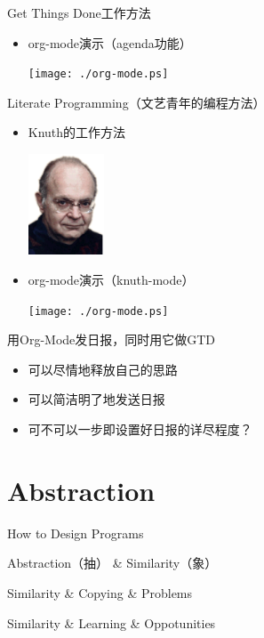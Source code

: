 \documentclass[presentation,dvipdfmx,CJKbookmarks]{beamer}
\begin{document}
\begin{CJK*}{UTF8}{simsun}
\begin{frame}[label={sec:org8fbf8ad}]{Get Things Done\thinspace 工作方法}
\begin{itemize}[<+->]
\item org-mode\thinspace 演示（agenda\thinspace 功能）

\begin{center}
\texttt{[image: ./org-mode.ps]}
\end{center}
\end{itemize}
\end{frame}

\begin{frame}[label={sec:orgecec971}]{Literate Programming（文艺青年的编程方法）}
\begin{itemize}[<+->]
\item Knuth\thinspace 的工作方法

\begin{center}
\includegraphics[height=3cm]{./knuth.ps}
\end{center}

\item org-mode\thinspace 演示（knuth-mode）

\begin{center}
\texttt{[image: ./org-mode.ps]}
\end{center}
\end{itemize}
\end{frame}

\begin{frame}[label={sec:orgbe044d0}]{用\thinspace Org-Mode\thinspace 发日报，同时用它做\thinspace GTD}
\begin{itemize}
\item 可以尽情地释放自己的思路
\item 可以简洁明了地发送日报
\item 可不可以一步即设置好日报的详尽程度？
\end{itemize}
\end{frame}

\section{Abstraction}
\label{sec:org9e675ce}

\begin{frame}[label={sec:orgb8e24d8}]{How to Design Programs}
\pause
\begin{block}{Abstraction（抽） \& Similarity（象）}
\pause
\end{block}
\begin{block}{Similarity \& Copying \& Problems}
\pause
\end{block}
\begin{block}{Similarity \& Learning \& Oppotunities}
\end{block}
\end{frame}


\end{CJK*}
\end{document}
